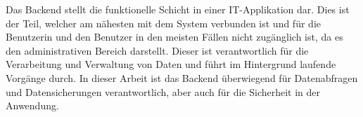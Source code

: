 Das Backend stellt die funktionelle Schicht in einer IT-Applikation dar. Dies ist der Teil, welcher am nähesten mit dem System verbunden ist und  für die Benutzerin und den Benutzer in den meisten Fällen nicht zugänglich ist, da es den administrativen Bereich darstellt. Dieser ist verantwortlich für die Verarbeitung und Verwaltung von Daten und führt im Hintergrund laufende Vorgänge durch. In dieser Arbeit ist das Backend überwiegend für Datenabfragen und Datensicherungen verantwortlich, aber auch für die Sicherheit in der Anwendung.
\cite{Backend_Basics}